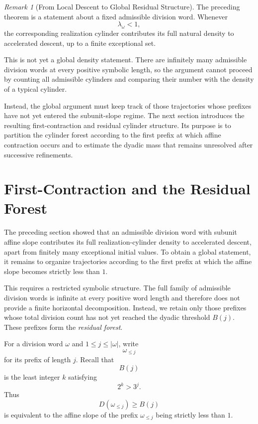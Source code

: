 \documentclass[12pt, oneside]{article}
\numberwithin{equation}{section}
\theoremstyle{definition}
\theoremstyle{plain}
\theoremstyle{remark}
\newtheorem*{remark}{Remark}
\begin{document}
\begin{remark}[From Local Descent to Global Residual Structure]
The preceding theorem is a statement about a fixed admissible division word.
Whenever
\[
\lambda_\omega<1,
\]
the corresponding realization cylinder contributes its full natural density
to accelerated descent, up to a finite exceptional set.

This is not yet a global density statement. There are infinitely many
admissible division words at every positive symbolic length, so the argument
cannot proceed by counting all admissible cylinders and comparing their
number with the density of a typical cylinder.

Instead, the global argument must keep track of those trajectories whose
prefixes have not yet entered the subunit-slope regime. The next section
introduces the resulting first-contraction and residual cylinder structure.
Its purpose is to partition the cylinder forest according to the first prefix
at which affine contraction occurs and to estimate the dyadic mass that
remains unresolved after successive refinements.
\end{remark}


\section{First-Contraction and the Residual Forest}
\label{sec:residual-forest}

The preceding section showed that an admissible division word with subunit
affine slope contributes its full realization-cylinder density to
accelerated descent, apart from finitely many exceptional initial values.
To obtain a global statement, it remains to organize trajectories according
to the first prefix at which the affine slope becomes strictly less than \(1\).

This requires a restricted symbolic structure. The full family of admissible
division words is infinite at every positive word length and therefore does
not provide a finite horizontal decomposition. Instead, we retain only those
prefixes whose total division count has not yet reached the dyadic threshold
\(B(j)\). These prefixes form the \emph{residual forest}.

For a division word \(\omega\) and \(1\le j\le|\omega|\), write
\[
\omega_{\le j}
\]
for its prefix of length \(j\). Recall that
\[
B(j)
\]
is the least integer \(k\) satisfying
\[
2^k>3^j.
\]
Thus
\[
D(\omega_{\le j})\ge B(j)
\]
is equivalent to the affine slope of the prefix \(\omega_{\le j}\) being
strictly less than \(1\).
\end{document}
